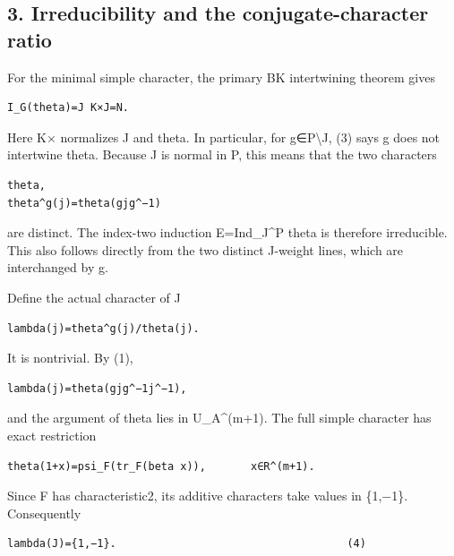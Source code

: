\hypertarget{rank~2-irreducibility-and-the-conjugate-character-ratio}{%
\subsection{3. Irreducibility and the conjugate-character
ratio}\label{rank~2-irreducibility-and-the-conjugate-character-ratio}}

For the minimal simple character, the primary BK intertwining theorem
gives

\begin{Verbatim}[fontsize=\small,breaklines=true,breakanywhere=true]
I_G(theta)=J K×J=N.
\end{Verbatim}

Here K× normalizes J and theta. In particular, for g∈P\textbackslash J,
(3) says g does not intertwine theta. Because J is normal in P, this
means that the two characters

\begin{Verbatim}[fontsize=\small,breaklines=true,breakanywhere=true]
theta,
theta^g(j)=theta(gjg^−1)
\end{Verbatim}

are distinct. The index-two induction E=Ind\_J\^{}P theta is therefore
irreducible. This also follows directly from the two distinct J-weight
lines, which are interchanged by g.

Define the actual character of J

\begin{Verbatim}[fontsize=\small,breaklines=true,breakanywhere=true]
lambda(j)=theta^g(j)/theta(j).
\end{Verbatim}

It is nontrivial. By (1),

\begin{Verbatim}[fontsize=\small,breaklines=true,breakanywhere=true]
lambda(j)=theta(gjg^−1j^−1),
\end{Verbatim}

and the argument of theta lies in U\_A\^{}(m+1). The full simple
character has exact restriction

\begin{Verbatim}[fontsize=\small,breaklines=true,breakanywhere=true]
theta(1+x)=psi_F(tr_F(beta x)),       x∈R^(m+1).
\end{Verbatim}

Since F has characteristic2, its additive characters take values in
\{1,−1\}. Consequently

\begin{Verbatim}[fontsize=\small,breaklines=true,breakanywhere=true]
lambda(J)={1,−1}.                                    (4)
\end{Verbatim}

